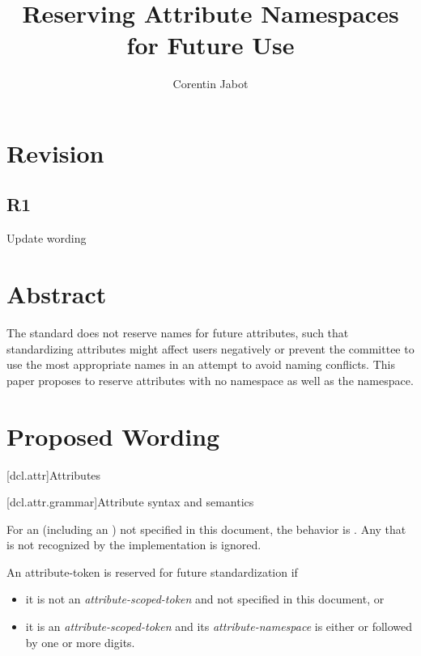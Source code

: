 \documentclass{wg21}
\title{Reserving Attribute Namespaces for Future Use}
\author{Corentin Jabot}{corentin.jabot@gmail.com}
\begin{document}
\maketitle

\section{Revision}

\subsection{R1}

Update wording

\section{Abstract}

The standard does not reserve names for future attributes, such that standardizing attributes might affect users negatively
or prevent the committee to use the most appropriate names in an attempt to avoid naming conflicts.
This paper proposes to reserve attributes with no namespace as well as the  namespace.

\section{Proposed Wording}

[dcl.attr]{Attributes}%

[dcl.attr.grammar]{Attribute syntax and semantics}

\pnum
For an 
(including an )
not specified in this document, the
behavior is .
Any  that is not recognized by the implementation
is ignored.

\begin{addedblock}
An attribute-token is reserved for future standardization if
\begin{itemize}
\item it is not an \emph{attribute-scoped-token} and not specified in this document, or
\item it is an \emph{attribute-scoped-token} and its \emph{attribute-namespace} is either  or  followed by one or more digits.
\end{itemize}
\end{addedblock}
\end{document}
